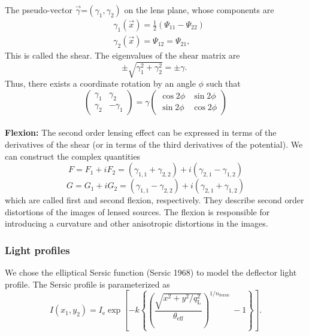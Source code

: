 \documentclass{aa}
\begin{document}
The pseudo-vector $\vec{\gamma}$=$(\gamma_1, \gamma_2)$ on the lens plane, whose components are
%
\begin{equation}
    \begin{aligned}
        & \gamma_1(\vec{x})=\frac{1}{2}\left(\Psi_{11}-\Psi_{22}\right) \\
        & \gamma_2(\vec{x})=\Psi_{12}=\Psi_{21},
    \end{aligned}
\end{equation}
%
This is called the shear. The eigenvalues of the shear matrix are
$$
\pm \sqrt{\gamma_1^2+\gamma_2^2}= \pm \gamma \text {. }
$$
Thus, there exists a coordinate rotation by an angle $\phi$ such that
$$
\left(\begin{array}{cc}
\gamma_1 & \gamma_2 \\
\gamma_2 & -\gamma_1
\end{array}\right)=\gamma\left(\begin{array}{cc}
\cos 2 \phi & \sin 2 \phi \\
\sin 2 \phi & \cos 2 \phi
\end{array}\right)
$$
\\
\newline 
\textbf{Flexion:} The second order lensing effect can be expressed in terms of the derivatives of the shear (or in terms of the third derivatives of the potential). We can construct the complex quantities
$$
F= F_1 + iF_2 = \left(\gamma_{\mathrm{1,1}} + \gamma_{\mathrm{2,2}}\right) + i\left(\gamma_{\mathrm{2,1}} - \gamma_{\mathrm{1,2}}\right)
$$
$$
G= G_1 + iG_2 = \left(\gamma_{\mathrm{1,1}} - \gamma_{\mathrm{2,2}}\right) + i\left(\gamma_{\mathrm{2,1}} + \gamma_{\mathrm{1,2}}\right)
$$
which are called first and second flexion, respectively. They describe second order distortions of the images of lensed sources. The flexion is responsible for introducing a curvature and other anisotropic distortions
in the images.


\subsubsection{Light profiles}

We chose the elliptical Sersic function (Sersic 1968) to model the deflector light profile. The Sersic profile is parameterized as
$$
I\left(x_1, y_2\right)=I_{\mathrm{e}} \exp \left[-k\left\{\left(\frac{\sqrt{x^2+y^2 / q_{\mathrm{L}}^2}}{\theta_{\mathrm{eff}}}\right)^{1 / n_{\text {Sersic }}}-1\right\}\right] .
$$
\end{document}
